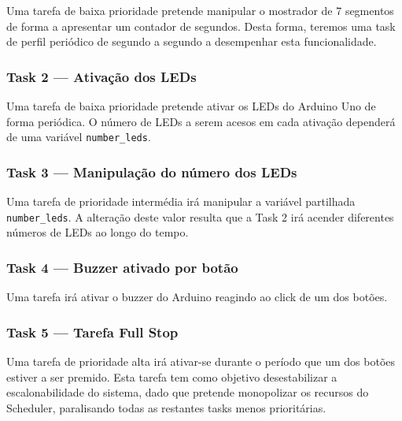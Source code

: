 \documentclass{article}
\begin{document}
Uma tarefa de baixa prioridade pretende manipular o mostrador de 7 segmentos de forma a apresentar um contador de segundos. Desta forma, teremos uma task de perfil periódico de segundo a segundo a desempenhar esta funcionalidade.

\subsubsection{Task 2 --- Ativação dos LEDs}
\label{task_2}
Uma tarefa de baixa prioridade pretende ativar os LEDs do Arduino Uno de forma periódica. O número de LEDs a serem acesos em cada ativação dependerá de uma variável \texttt{number\_leds}.

\subsubsection{Task 3 --- Manipulação do número dos LEDs}

Uma tarefa de prioridade intermédia irá manipular a variável partilhada \texttt{number\_leds}. A alteração deste valor resulta que a Task 2 irá acender diferentes números de LEDs ao longo do tempo.

\subsubsection{Task 4 --- Buzzer ativado por botão}

Uma tarefa irá ativar o buzzer do Arduino reagindo ao click de um dos botões.

\subsubsection{Task 5 --- Tarefa Full Stop}

Uma tarefa de prioridade alta irá ativar-se durante o período que um dos botões estiver a ser premido. Esta tarefa tem como objetivo desestabilizar a escalonabilidade do sistema, dado que pretende monopolizar os recursos do Scheduler, paralisando todas as restantes tasks menos prioritárias. 
\end{document}
